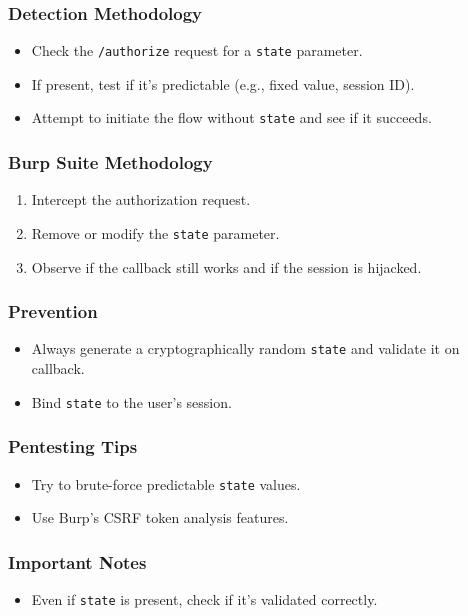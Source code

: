 \documentclass[12pt,a4paper]{article}
\begin{document}
\subsubsection{Detection Methodology}
\begin{itemize}
    \item Check the \texttt{/authorize} request for a \texttt{state} parameter.
    \item If present, test if it's predictable (e.g., fixed value, session ID).
    \item Attempt to initiate the flow without \texttt{state} and see if it succeeds.
\end{itemize}

\subsubsection{Burp Suite Methodology}
\begin{enumerate}
    \item Intercept the authorization request.
    \item Remove or modify the \texttt{state} parameter.
    \item Observe if the callback still works and if the session is hijacked.
\end{enumerate}

\subsubsection{Prevention}
\begin{itemize}
    \item Always generate a cryptographically random \texttt{state} and validate it on callback.
    \item Bind \texttt{state} to the user's session.
\end{itemize}


\subsubsection{Pentesting Tips}
\begin{itemize}
    \item Try to brute-force predictable \texttt{state} values.
    \item Use Burp's CSRF token analysis features.
\end{itemize}

\subsubsection{Important Notes}
\begin{itemize}
    \item Even if \texttt{state} is present, check if it's validated correctly.
\end{itemize}
\end{document}
